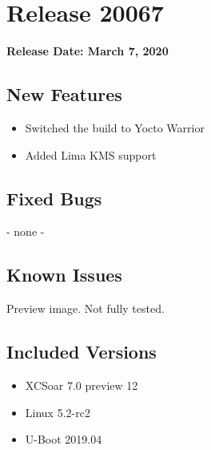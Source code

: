 \chapter*{Release 20067}

\begin{flushleft}
	\textbf{Release Date: March 7, 2020}
\end{flushleft}

\section*{New Features}

\begin{itemize}
	\item Switched the build to Yocto Warrior
	\item Added Lima KMS support
\end{itemize}

\section*{Fixed Bugs}
	- none -

\section*{Known Issues}
Preview image. Not fully tested.

\section*{Included Versions}

\begin{itemize}
	\item XCSoar 7.0 preview 12
	\item Linux 5.2-rc2
	\item U-Boot 2019.04
\end{itemize}
